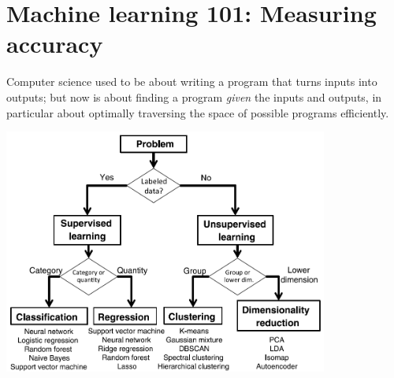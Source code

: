 \documentclass{article}
\begin{document}
\newpage
\section{Machine learning 101: Measuring accuracy}
Computer science used to be about writing a program that turns inputs into outputs; but now is about finding a program \textit{given} the inputs and outputs, in particular about optimally traversing the space of possible programs efficiently.

\begin{center}
    \includegraphics[width=0.8\textwidth]{MLtree.png}
\end{center}
\end{document}
